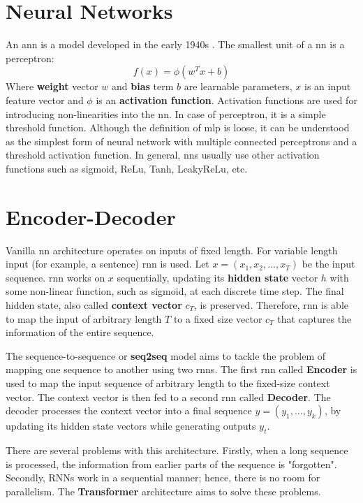 \section{Neural Networks}
An \Gls{ann} is a model developed in the early 1940s \cite{mcculloch1943logical}. The smallest unit of a \Gls{nn} is a perceptron:
\begin{equation}
    f(x) = \phi(w^Tx + b)
\end{equation}
Where \textbf{weight} vector $w$ and \textbf{bias} term $b$ are learnable parameters, $x$ is an input feature vector and $\phi$ is an \textbf{activation function}. Activation functions are used for introducing non-linearities into the \Gls{nn}. In case of perceptron, it is a simple threshold function. Although the definition of \Gls{mlp} is loose, it can be understood as the simplest form of neural network with multiple connected perceptrons and a threshold activation function. In general, \Gls{nn}s usually use other activation functions such as sigmoid, ReLu, Tanh, LeakyReLu, etc.





\section{Encoder-Decoder}
Vanilla \Gls{nn} architecture operates on inputs of fixed length. For variable length input (for example, a sentence) \Gls{rnn} is used. Let $x = (x_1,x_2,...,x_T)$ be the input sequence. \gls{rnn} works on $x$ sequentially, updating its \textbf{hidden state} vector $h$ with some non-linear function, such as sigmoid, at each discrete time step. The final hidden state, also called \textbf{context vector} $c_T$, is preserved.
Therefore, \Gls{rnn} is able to map the input of arbitrary length $T$ to a fixed size vector $c_T$ that captures the information of the entire sequence.

The sequence-to-sequence \cite{sutskever2014sequence,cho2014learning} or \textbf{seq2seq} model aims to tackle the problem of mapping one sequence to another using two \Gls{rnn}s. The first \Gls{rnn} called \textbf{Encoder} is used to map the input sequence of arbitrary length to the fixed-size context vector. The context vector is then fed to a second \Gls{rnn} called \textbf{Decoder}. The decoder processes the context vector into a final sequence $y = (y_1,...,y_k)$, by updating its hidden state vectors while generating outputs $y_t$.

There are several problems with this architecture. Firstly, when a long sequence is processed, the information from earlier parts of the sequence is "forgotten". Secondly, RNNs work in a sequential manner; hence, there is no room for parallelism. The \textbf{Transformer} architecture aims to solve these problems.





